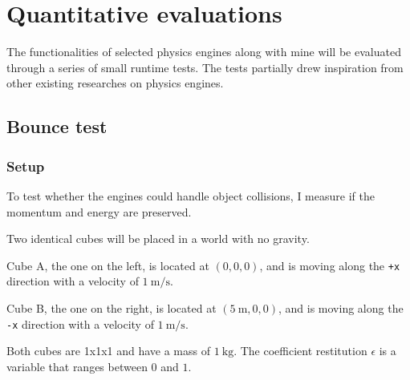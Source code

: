 \documentclass[12pt,a4paper,twoside,openright]{report}
\newcommand{\code}{\texttt}
\begin{document}
\begin{table}[h]
  \centering
\end{table}


\section{Quantitative evaluations}

The functionalities of selected physics engines along with mine will be evaluated through a series of small runtime tests.
The tests partially drew inspiration from other existing researches on physics engines\cite{seugling2006evaluation}.

\subsection{Bounce test}

\subsubsection{Setup}

To test whether the engines could handle object collisions, I measure if the momentum and energy are preserved.

Two identical cubes will be placed in a world with no gravity. 

Cube A, the one on the left, is located at $(0, 0, 0)$, and is moving along the \code{+x} direction with a velocity of $\SI{1}{\m\per\s}$.

Cube B, the one on the right, is located at $(\SI{5}{\m}, 0, 0)$, and is moving along the \code{-x} direction with a velocity of $\SI{1}{\m\per\s}$.

Both cubes are 1x1x1 and have a mass of $\SI{1}{\kg}$. The coefficient restitution $\epsilon$ is a variable that ranges between $0$ and $1$.

\begin{center}
\end{center}
\end{document}
